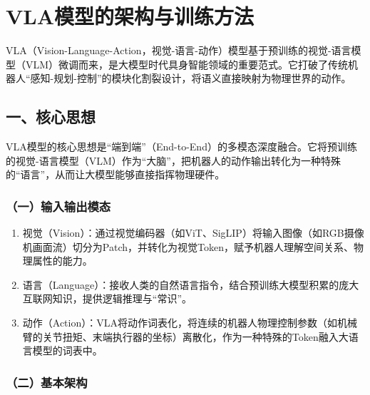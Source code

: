 \setcounter{section}{0}

\hypertarget{vlaux6a21ux578bux7684ux67b6ux6784ux4e0eux8badux7ec3ux65b9ux6cd5}{%
\section{VLA模型的架构与训练方法}\label{vlaux6a21ux578bux7684ux67b6ux6784ux4e0eux8badux7ec3ux65b9ux6cd5}}

VLA（Vision-Language-Action，视觉-语言-动作）模型基于预训练的视觉-语言模型（VLM）微调而来，是大模型时代具身智能领域的重要范式。它打破了传统机器人``感知-规划-控制''的模块化割裂设计，将语义直接映射为物理世界的动作。

\hypertarget{ux4e00ux6838ux5fc3ux601dux60f3-13}{%
\subsection{一、核心思想}\label{ux4e00ux6838ux5fc3ux601dux60f3-13}}

VLA模型的核心思想是``端到端''（End-to-End）的多模态深度融合。它将预训练的视觉-语言模型（VLM）作为``大脑''，把机器人的动作输出转化为一种特殊的``语言''，从而让大模型能够直接指挥物理硬件。

\hypertarget{ux4e00ux8f93ux5165ux8f93ux51faux6a21ux6001}{%
\subsubsection{（一）输入输出模态}\label{ux4e00ux8f93ux5165ux8f93ux51faux6a21ux6001}}

\begin{enumerate}
\def\labelenumi{\arabic{enumi}.}
\item
  视觉（Vision）：通过视觉编码器（如ViT、SigLIP）将输入图像（如RGB摄像机画面流）切分为Patch，并转化为视觉Token，赋予机器人理解空间关系、物理属性的能力。
\item
  语言（Language）：接收人类的自然语言指令，结合预训练大模型积累的庞大互联网知识，提供逻辑推理与``常识''。
\item
  动作（Action）：VLA将动作词表化，将连续的机器人物理控制参数（如机械臂的关节扭矩、末端执行器的坐标）离散化，作为一种特殊的Token融入大语言模型的词表中。
\end{enumerate}

\hypertarget{ux4e8cux57faux672cux67b6ux6784}{%
\subsubsection{（二）基本架构}\label{ux4e8cux57faux672cux67b6ux6784}}

